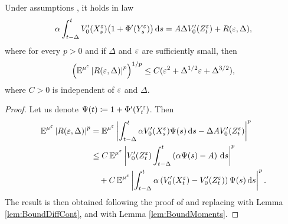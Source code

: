 \documentclass[10pt]{article}
\begin{document}
\begin{lemma}\label{lem:ContFirstBound} Under assumptions , it holds in law
\begin{equation}
	\alpha \int_{t-\Delta}^t V_0'(X^\varepsilon_s)\big(1 + \Phi'(Y^\varepsilon_s)\big)\,\mathrm{d} s = A \Delta V_0'(Z^\varepsilon_t) + R(\varepsilon, \Delta),
\end{equation}
where for every $p > 0$ and if $\Delta$ and $\varepsilon$ are sufficiently small, then
\begin{equation}
	\left( \operatorname{\mathbb{E}}^{\mu^\varepsilon} \left\lvert R(\varepsilon, \Delta)\right\rvert^p \right)^{1/p} \leq C(\varepsilon^2 + \Delta^{1/2}\varepsilon + \Delta^{3/2}),
\end{equation}
where $C > 0$ is independent of $\varepsilon$ and $\Delta$.
\end{lemma}
\begin{proof} Let us denote $\Psi(t) \coloneqq 1 + \Phi'(Y^\varepsilon_t)$. Then
	\begin{equation}
	\begin{aligned}
		\operatorname{\mathbb{E}}^{\mu^\varepsilon} \left\lvert R(\varepsilon, \Delta)\right\rvert^p &= \operatorname{\mathbb{E}}^{\mu^\varepsilon} \left\lvert\int_{t-\Delta}^t \alpha V_0'(X_s^\varepsilon)\Psi(s) \,\mathrm{d} s - \Delta A V_0'(Z_t^\varepsilon)\right\rvert^p \\
		&\leq C \operatorname{\mathbb{E}}^{\mu^\varepsilon}\left| V_0'(Z_t^\varepsilon) \int_{t-\Delta}^t \left(\alpha \Psi(s) - A\right) \,\mathrm{d} s \right|^p \\
		&\quad +C \operatorname{\mathbb{E}}^{\mu^\varepsilon} \left| \int_{t-\Delta}^t \alpha \left(V_0'(X_t^\varepsilon ) - V_0'(Z_t^\varepsilon)\right) \Psi(s) \,\mathrm{d} s \right|^p.
	\end{aligned}
	\end{equation}	
	The result is then obtained following the proof of \cite[Proposition 5.8]{PaS07} and replacing \cite[Lemma 6.1]{PaS07} with Lemma \ref{lem:BoundDiffCont}, and \cite[Corollary 4.1]{PaS07} with Lemma \ref{lem:BoundMoments}.
\end{proof}
\end{document}
